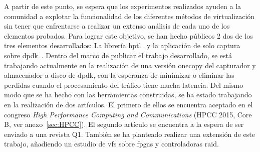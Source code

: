 A partir de este punto, se espera que los experimentos realizados ayuden a la comunidad a explotar la funcionalidad de los diferentes métodos de virtualización sin tener que enfrentarse a realizar un extenso análisis de cada uno de los elementos probados. Para lograr este objetivo, se han hecho públicos 2 dos de los tres elementos desarrollados: La librería hptl~\cite{bib:hptl} y la aplicación de solo captura sobre \gls{dpdk}~\cite{dpdkspeedometer}. Dentro del marco de publicar el trabajo desarrollado, se está trabajando actualmente en la realización de una versión \gls{onecopy} del capturador y almacenador a disco de \gls{dpdk}, con la esperanza de minimizar o eliminar las perdidas cuando el procesamiento del tráfico tiene mucha latencia.
%
Del mismo modo que se ha hecho con las herramientas construidas, se ha estado trabajando en la realización de dos artículos. El primero de ellos se encuentra aceptado en el congreso \textit{High Performance Computing and Communications} (HPCC 2015, Core B, ver anexo~\ref{sec:HPCC}). El segundo artículo se encuentra a la espera de ser enviado a una revista Q1. También se ha planteado realizar una extensión de este trabajo, añadiendo un estudio de \glspl{vf} sobre \glspl{fpga} y controladoras raid.





%



